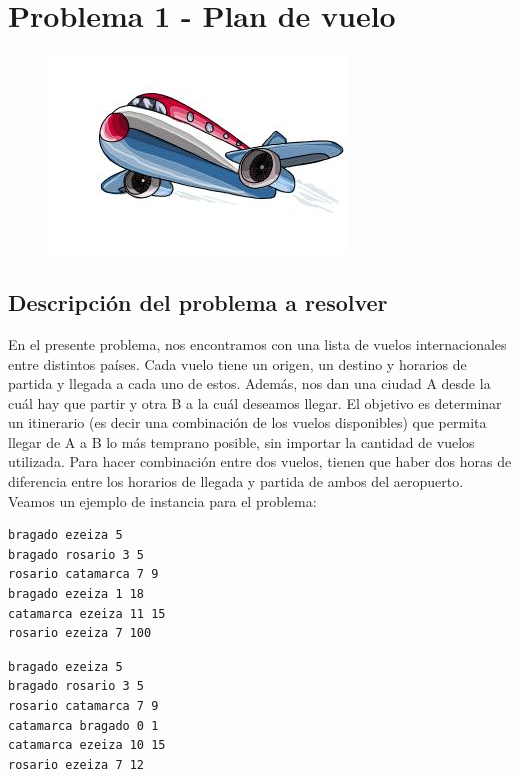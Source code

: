 \documentclass[11pt, a4paper, twoside]{article}
\begin{document}


\clearpage
\section{Problema 1 - Plan de vuelo}

\begin{figure}[H]
\centering
\includegraphics[scale=0.5]{imagenes/plane.jpg}
\end{figure}

\subsection{Descripción del problema a resolver}
En el presente problema, nos encontramos con una lista de vuelos internacionales
entre distintos países. Cada vuelo tiene un origen, un destino y horarios de 
partida y llegada a cada uno de estos. Además, nos dan una ciudad A desde
la cuál hay que partir y otra B a la cuál deseamos llegar. El objetivo es determinar un 
itinerario (es decir una combinación de los vuelos disponibles) que permita llegar 
de A a B lo más temprano posible, sin importar la cantidad de vuelos utilizada. Para
hacer combinación entre dos vuelos, tienen que haber dos horas de diferencia entre los
horarios de llegada y partida de ambos del aeropuerto. Veamos un ejemplo de instancia 
para el problema: \\

\begin{minipage}[t]{0.4\textwidth}
\begin{Verbatim}[frame=single,framesep=1cm,label= Ejemplo de instancia 1]
bragado ezeiza 5
bragado rosario 3 5
rosario catamarca 7 9
bragado ezeiza 1 18
catamarca ezeiza 11 15
rosario ezeiza 7 100
\end{Verbatim}
\end{minipage}
\hfill
\begin{minipage}[t]{0.4\textwidth}
\begin{Verbatim}[frame=single,framesep=1cm,label= Ejemplo de instancia 2]
bragado ezeiza 5
bragado rosario 3 5
rosario catamarca 7 9
catamarca bragado 0 1
catamarca ezeiza 10 15
rosario ezeiza 7 12
\end{Verbatim}
\end{minipage}
\end{document}
